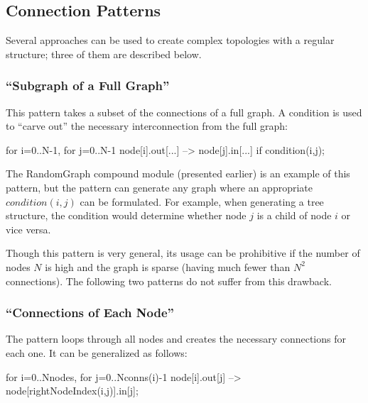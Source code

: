 \subsection{Connection Patterns}
\label{sec:ned-lang:connection-design-patterns}


Several approaches can be used to create complex topologies with a
regular structure; three of them are described below.


\subsubsection{``Subgraph of a Full Graph''}
\label{sec:ned-lang:subgraph-of-full-graph}


This pattern takes a subset of the connections of a full graph.  A
condition is used to ``carve out'' the necessary interconnection from
the full graph:

\begin{ned}
for i=0..N-1, for j=0..N-1 {
    node[i].out[...] --> node[j].in[...] if condition(i,j);
}
\end{ned}

The RandomGraph compound module (presented earlier) is an example of
this pattern, but the pattern can generate any graph where an
appropriate $condition(i,j)$ can be formulated. For example,
when generating a tree structure, the condition
would determine whether node $j$ is a child of node $i$ or
vice versa.

Though this pattern is very general, its usage can be prohibitive if
the number of nodes $N$ is high and the graph is sparse (having
much fewer than $N^2$ connections). The following
two patterns do not suffer from this drawback.


\subsubsection{``Connections of Each Node''}
\label{sec:ned-lang:connections-of-each-node}

The pattern loops through all nodes and creates the necessary
connections for each one. It can be generalized as follows:

\begin{ned}
for i=0..Nnodes, for j=0..Nconns(i)-1 {
    node[i].out[j] --> node[rightNodeIndex(i,j)].in[j];
}
\end{ned}

